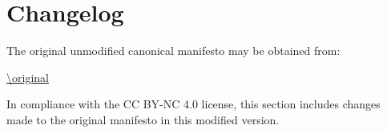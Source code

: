 \section{Changelog}

The original unmodified canonical manifesto may be obtained from:

\bigskip

\url{\original}

\bigskip

\noindent In compliance with the CC BY-NC 4.0 license, this section includes changes made to the original manifesto in this modified version.

